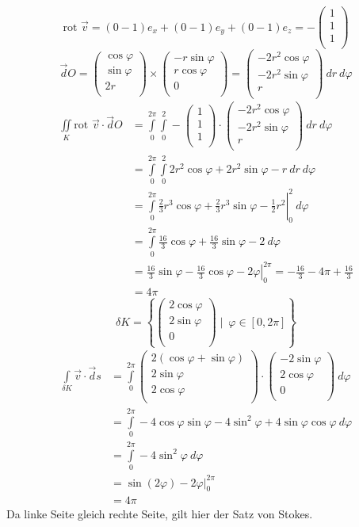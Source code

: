 \documentclass[10pt,a4paper,parskip=half]{scrartcl}
\newcommand{\vecthree}[3]{\begin{pmatrix}#1\\#2\\#3\\\end {pmatrix}}
\begin{document}
\[ \text{rot } \vec v =  (0 - 1 )e_x + (0 - 1 )e_y + (0 - 1)e_z = -\vecthree{1}{1}{1}\]
\[ \vec dO = \vecthree{\cos \varphi}{\sin \varphi}{2r} \times \vecthree{-r\sin \varphi}{r\cos \varphi}{0} = \vecthree{-2r^2 \cos \varphi}{-2r^2\sin \varphi}{r} ~dr~ d\varphi \]
\begin{align*}
\iint\limits_{K} \text{rot } \vec v \cdot \vec dO &= \int\limits_{0}^{2\pi}\int\limits_{0}^{2} -\vecthree{1}{1}{1} \cdot \vecthree{-2r^2 \cos \varphi}{-2r^2\sin \varphi}{r} ~dr~ d\varphi \\
&= \int\limits_{0}^{2\pi}\int\limits_{0}^{2} 2r^2\cos \varphi + 2r^2 \sin \varphi -r   ~dr~ d\varphi \\
&= \left.\int\limits_{0}^{2\pi} \frac 23 r^3 \cos \varphi + \frac 23 r^3 \sin \varphi - \frac 12 r^2 \right|_{0}^{2}   ~ d\varphi \\
&= \int\limits_{0}^{2\pi} \frac {16}3  \cos \varphi + \frac {16}{3} \sin \varphi - 2   ~ d\varphi \\
&= \left.\frac {16}3  \sin \varphi - \frac {16}{3} \cos \varphi - 2\varphi \right|_{0}^{2\pi}   
= - \frac {16}{3} - 4\pi + \frac{16}{3} \\
&= 4\pi
\end{align*}
\[ \delta K =  \left\{  \vecthree{2 \cos \varphi}{2 \sin \varphi}{0} \mid~ \varphi \in [0,2\pi] \right\} \]
\begin{align*}
\int\limits_{\delta K} \vec v \cdot \vec ds &= \int\limits_{0}^{2\pi}\vecthree{2(\cos \varphi+ \sin \varphi)}{2\sin\varphi}{2\cos\varphi} \cdot \vecthree{-2\sin \varphi}{2\cos \varphi}{0} ~d\varphi \\
&= \int\limits_{0}^{2\pi} -4 \cos\varphi\sin \varphi -4 \sin^2 \varphi + 4\sin \varphi\cos\varphi ~d\varphi \\
&= \int\limits_{0}^{2\pi} -4 \sin^2 \varphi ~d\varphi \\
&= \left. \sin(2\varphi) - 2\varphi \right|^{2\pi}_0 \\
&= 4\pi
\end{align*}
Da linke Seite gleich rechte Seite, gilt hier der Satz von Stokes.
\end{document}
